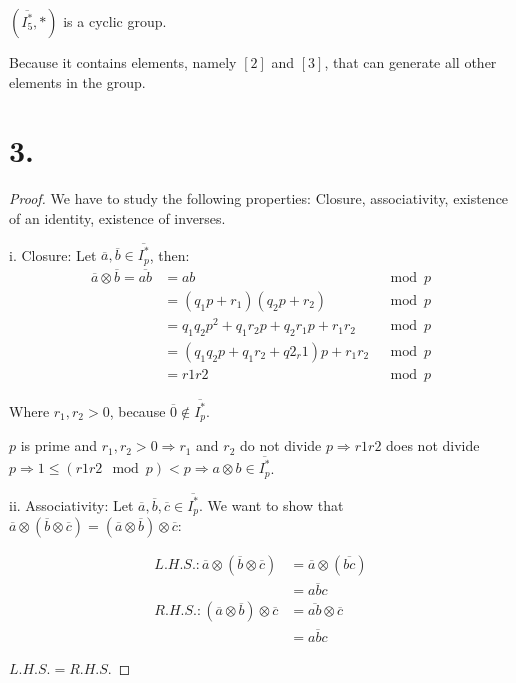 \documentclass{article}
\begin{document}
\noindent
$(\overline{I_5^*}, *)$ is a cyclic group. 

\noindent
Because it contains elements, namely $[2]$ and $[3]$, that can generate all other elements in the group.

\section*{3.}

\begin{proof}
  We have to study the following properties: Closure, associativity, existence of an identity, existence of inverses.
\newline

\noindent
i. Closure: Let $\overline{a},\overline{b} \in \overline{I_p^*}$, then:
\noindent
\begin{align*}
  \overline{a} \otimes \overline{b} = \overline{ab} &= ab &\mod{p} \\
  & = (q_1p + r_1)(q_2p +r_2) &\mod{p} \\
  &= q_1q_2p^2 + q_1r_2p + q_2r_1p + r_1r_2 &\mod{p} \\
  &= (q_1q_2p + q_1r_2 + q2_r1)p + r_1r_2 &\mod{p} \\
  &= r1r2 &\mod{p}
\end{align*}

\noindent
Where $r_1, r_2 > 0$, because $\overline{0} \not \in \overline{I_p^*}$.

\noindent
$p$ is prime and $r_1, r_2 >0 \Rightarrow r_1$ and $r_2$ do not divide $p \Rightarrow r1r2$ does not divide $p \Rightarrow 1 \leq (r1r2 \mod{p}) < p \Rightarrow a \otimes b \in \overline{I_p^*}$.
\newline

\noindent
ii. Associativity: Let $\overline{a}, \overline{b}, \overline{c} \in \overline{I_p^*}$. We want to show that $\overline{a} \otimes (\overline{b} \otimes \overline{c}) = (\overline{a} \otimes \overline{b}) \otimes \overline{c}$:

\begin{align*}
  L.H.S.: \overline{a} \otimes (\overline{b} \otimes \overline{c}) &=  \overline{a} \otimes (\overline{bc}) \\
  &= \overline{abc} \\
  R.H.S.: (\overline{a} \otimes \overline{b}) \otimes \overline{c} &= \overline{ab} \otimes \overline{c} \\
  &= \overline{abc}
\end{align*}

$L.H.S. = R.H.S.$
\newline


\end{proof}
\end{document}
